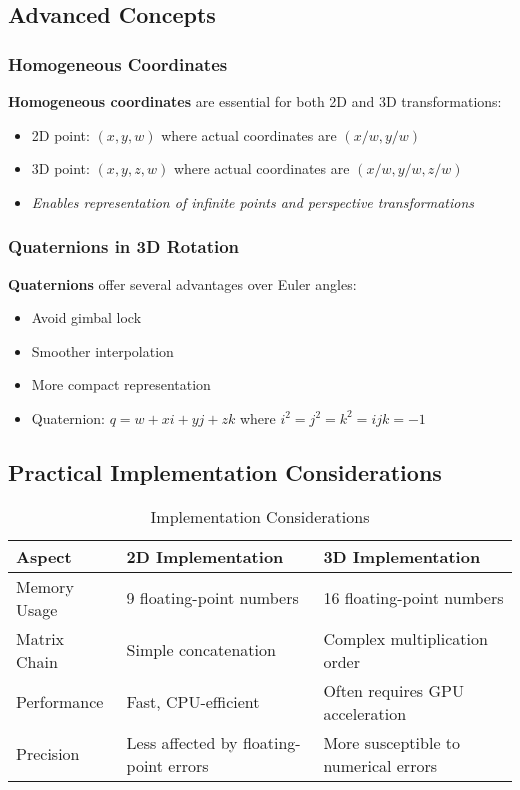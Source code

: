 \documentclass[12pt]{article}
\begin{document}
\subsection{Advanced Concepts}

\subsubsection{Homogeneous Coordinates}
\textcolor{important}{\textbf{Homogeneous coordinates}} are essential for both 2D and 3D transformations:
\begin{itemize}
    \item 2D point: $(x, y, w)$ where actual coordinates are $(x/w, y/w)$
    \item 3D point: $(x, y, z, w)$ where actual coordinates are $(x/w, y/w, z/w)$
    \item \textcolor{note}{\textit{Enables representation of infinite points and perspective transformations}}
\end{itemize}

\subsubsection{Quaternions in 3D Rotation}
\textcolor{important}{\textbf{Quaternions}} offer several advantages over Euler angles:
\begin{itemize}
    \item Avoid gimbal lock
    \item Smoother interpolation
    \item More compact representation
    \item Quaternion: $q = w + xi + yj + zk$ where $i^2 = j^2 = k^2 = ijk = -1$
\end{itemize}

\subsection{Practical Implementation Considerations}

\begin{table}[h]
\centering
\begin{tabulary}{\textwidth}{LLL}
\toprule
\textbf{Aspect} & \textbf{2D Implementation} & \textbf{3D Implementation} \\
\midrule
Memory Usage & 9 floating-point numbers & 16 floating-point numbers \\
Matrix Chain & Simple concatenation & Complex multiplication order \\
Performance & Fast, CPU-efficient & Often requires GPU acceleration \\
Precision & Less affected by floating-point errors & More susceptible to numerical errors \\
\bottomrule
\end{tabulary}
\caption{Implementation Considerations}
\label{tab:implementation-comparison}
\end{table}
\end{document}
